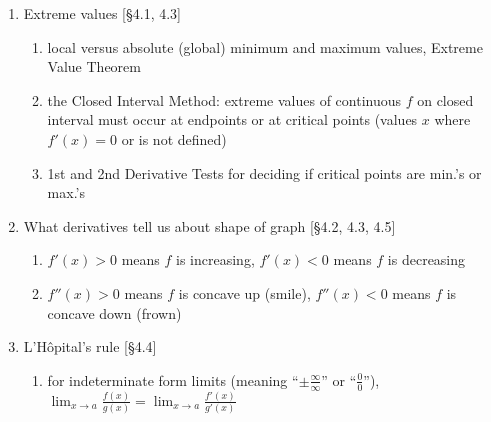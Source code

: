 \documentclass[11pt]{article}
\begin{document}
\begin{enumerate}

\item Extreme values [\S 4.1, 4.3]
\begin{enumerate}
\item local versus absolute (global) minimum and maximum values, Extreme Value Theorem
\item the Closed Interval Method: extreme values of continuous $f$ on closed interval must occur at endpoints or at critical points (values $x$ where $f'(x)=0$ or is not defined)
\item 1st and 2nd Derivative Tests for deciding if critical points are min.'s or max.'s
\end{enumerate}

\item What derivatives tell us about shape of graph [\S 4.2, 4.3, 4.5]
\begin{enumerate}
\item $f'(x)>0$ means $f$ is increasing, $f'(x) <0$ means $f$ is decreasing
\item $f''(x)>0$ means $f$ is concave up (smile), $f''(x) <0$ means $f$ is concave down (frown)
\end{enumerate}

\item L'H\^{o}pital's rule [\S 4.4]
\begin{enumerate}
\item for indeterminate form limits (meaning ``$\pm \frac{\infty}{\infty}$'' or ``$\frac{0}{0}$''), $\displaystyle \lim_{x\to a} \frac{f(x)}{g(x)} = \lim_{x\to a} \frac{f'(x)}{g'(x)}$
\end{enumerate}

\end{enumerate}
\end{document}

